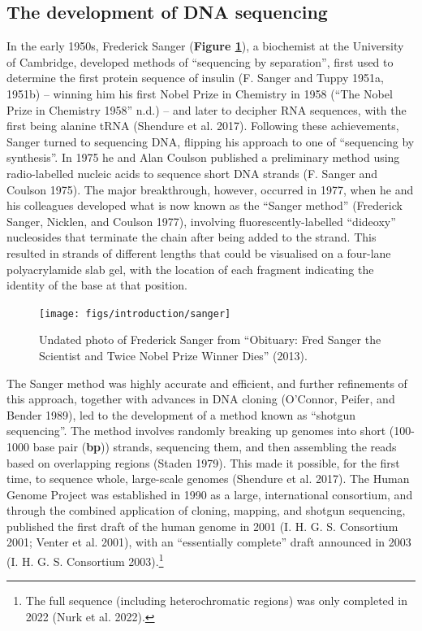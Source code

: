 \documentclass[
]{book}
\begin{document}
\hypertarget{the-development-of-dna-sequencing}{%
\subsection{The development of DNA sequencing}\label{the-development-of-dna-sequencing}}

In the early 1950s, Frederick Sanger (\textbf{Figure \ref{fig:sanger}}), a biochemist at the University of Cambridge, developed methods of ``sequencing by separation'', first used to determine the first protein sequence of insulin (F. Sanger and Tuppy 1951a, 1951b) -- winning him his first Nobel Prize in Chemistry in 1958 ({``The {Nobel Prize} in {Chemistry} 1958''} n.d.) -- and later to decipher RNA sequences, with the first being alanine tRNA (Shendure et al. 2017). Following these achievements, Sanger turned to sequencing DNA, flipping his approach to one of ``sequencing by synthesis''. In 1975 he and Alan Coulson published a preliminary method using radio-labelled nucleic acids to sequence short DNA strands (F. Sanger and Coulson 1975). The major breakthrough, however, occurred in 1977, when he and his colleagues developed what is now known as the ``Sanger method'' (Frederick Sanger, Nicklen, and Coulson 1977), involving fluorescently-labelled ``dideoxy'' nucleosides that terminate the chain after being added to the strand. This resulted in strands of different lengths that could be visualised on a four-lane polyacrylamide slab gel, with the location of each fragment indicating the identity of the base at that position.



\begin{figure}

{\centering \texttt{[image: figs/introduction/sanger]} 

}

\caption{Undated photo of Frederick Sanger from {``Obituary: {Fred Sanger} the Scientist and Twice {Nobel Prize} Winner Dies''} (2013).}\label{fig:sanger}
\end{figure}

The Sanger method was highly accurate and efficient, and further refinements of this approach, together with advances in DNA cloning (O'Connor, Peifer, and Bender 1989), led to the development of a method known as ``shotgun sequencing''. The method involves randomly breaking up genomes into short (100-1000 base pair (\textbf{bp})) strands, sequencing them, and then assembling the reads based on overlapping regions (Staden 1979). This made it possible, for the first time, to sequence whole, large-scale genomes (Shendure et al. 2017). The Human Genome Project was established in 1990 as a large, international consortium, and through the combined application of cloning, mapping, and shotgun sequencing, published the first draft of the human genome in 2001 (I. H. G. S. Consortium 2001; Venter et al. 2001), with an ``essentially complete'' draft announced in 2003 (I. H. G. S. Consortium 2003).\footnote{The full sequence (including heterochromatic regions) was only completed in 2022 (Nurk et al. 2022).}
\end{document}
